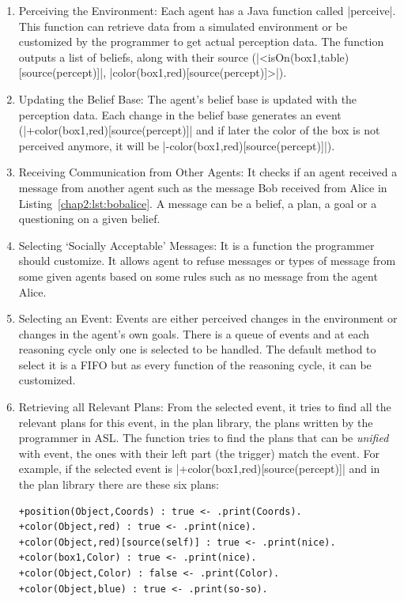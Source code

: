 \documentclass[a4paper,11pt,twoside]{StyleThese}
\begin{document}
\begin{enumerate}
	\item Perceiving the Environment: Each agent has a Java function called |perceive|. This function can retrieve data from a simulated environment or be customized by the programmer to get actual perception data. The function outputs a list of beliefs, along with their source (\eg |<isOn(box1,table)[source(percept)]|, |color(box1,red)[source(percept)]>|).
	\item Updating the Belief Base: The agent's belief base is updated with the perception data. Each change in the belief base generates an event (\eg |+color(box1,red)[source(percept)]| and if later the color of the box is not perceived anymore, it will be |-color(box1,red)[source(percept)]|).\label{chap2:list:update_bb}
	\item Receiving Communication from Other Agents: It checks if an agent received a message from another agent such as the message Bob received from Alice in Listing~\ref{chap2:lst:bobalice}. A message can be a belief, a plan, a goal or a questioning on a given belief.
	\item Selecting ‘Socially Acceptable’ Messages: It is a function the programmer should customize. It allows agent to refuse messages or types of message from some given agents based on some rules such as no message from the agent Alice.
	\item Selecting an Event: Events are either perceived changes in the environment or changes in the agent's own goals. There is a queue of events and at each reasoning cycle only one is selected to be handled. The default method to select it is a FIFO but as every function of the reasoning cycle, it can be customized. 
	\item Retrieving all Relevant Plans: From the selected event, it tries to find all the relevant plans for this event, in the plan library, \ie the plans written by the programmer in ASL. The function tries to find the plans that can be \textit{unified} with event, \ie the ones with their left part (the trigger) match the event. For example, if the selected event is |+color(box1,red)[source(percept)]| and in the plan library there are these six plans:
\begin{lstlisting}[style=inline]
+position(Object,Coords) : true <- .print(Coords).
+color(Object,red) : true <- .print(nice).
+color(Object,red)[source(self)] : true <- .print(nice).
+color(box1,Color) : true <- .print(nice).
+color(Object,Color) : false <- .print(Color).
+color(Object,blue) : true <- .print(so-so).

\end{lstlisting}
\end{enumerate}
\end{document}
